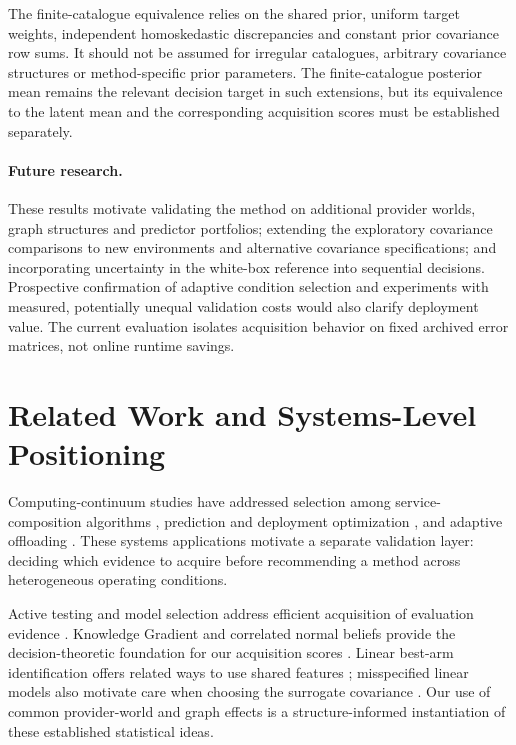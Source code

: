 \documentclass[10pt,a4paper]{article}
\newif\ifrevisionmarked
\newcommand{\revadd}[1]{\ifrevisionmarked\hl{#1}\else#1\fi}
\begin{document}
\revadd{The finite-catalogue equivalence relies on the shared prior, uniform target weights, independent homoskedastic discrepancies and constant prior covariance row sums. It should not be assumed for irregular catalogues, arbitrary covariance structures or method-specific prior parameters. The finite-catalogue posterior mean remains the relevant decision target in such extensions, but its equivalence to the latent mean and the corresponding acquisition scores must be established separately.}

\paragraph{Future research.}
These results motivate validating the method on additional provider worlds, graph structures and predictor portfolios; extending the exploratory covariance comparisons to new environments and alternative covariance specifications; and incorporating uncertainty in the white-box reference into sequential decisions. Prospective confirmation of adaptive condition selection and experiments with measured, potentially unequal validation costs would also clarify deployment value. The current evaluation isolates acquisition behavior on fixed archived error matrices, not online runtime savings.

\section{Related Work and Systems-Level Positioning}
Computing-continuum studies have addressed selection among service-composition algorithms \cite{pozas2023}, prediction and deployment optimization \cite{stupar2023}, and adaptive offloading \cite{sedlak2024}. These systems applications motivate a separate validation layer: deciding which evidence to acquire before recommending a method across heterogeneous operating conditions.

Active testing and model selection address efficient acquisition of evaluation evidence \cite{hara2024,kossen2021}. Knowledge Gradient and correlated normal beliefs provide the decision-theoretic foundation for our acquisition scores \cite{frazier2008,frazier2009,negoescu2011}. Linear best-arm identification offers related ways to use shared features \cite{soare2014}; misspecified linear models also motivate care when choosing the surrogate covariance \cite{reda2021}. Our use of common provider-world and graph effects is a structure-informed instantiation of these established statistical ideas.
\end{document}
